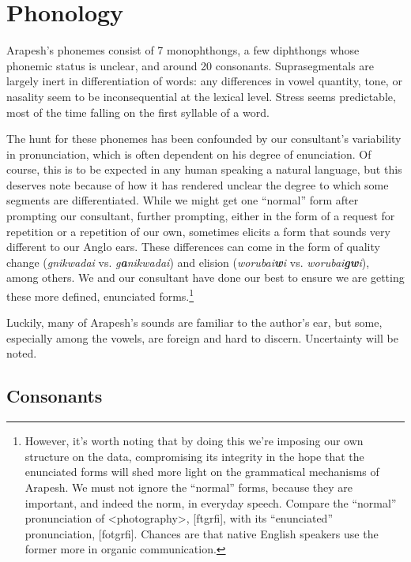 \documentclass[pdftex,12pt,letterpaper]{article}
\let\ipa\textipa
\begin{document}
\section{Phonology}

Arapesh's phonemes consist of 7 monophthongs, a few diphthongs whose phonemic status is unclear, and around 20 consonants. Suprasegmentals are largely inert in differentiation of words: any differences in vowel quantity, tone, or nasality seem to be inconsequential at the lexical level. Stress seems predictable, most of the time falling on the first syllable of a word. 

The hunt for these phonemes has been confounded by our consultant's variability in pronunciation, which is often dependent on his degree of enunciation. Of course, this is to be expected in any human speaking a natural language, but this deserves note because of how it has rendered unclear the degree to which some segments are differentiated. While we might get one ``normal'' form after prompting our consultant, further prompting, either in the form of a request for repetition or a repetition of our own, sometimes elicits a form that sounds very different to our Anglo ears. These differences can come in the form of quality change (\emph{g\textbf{\ipa{@}}nikwadai} vs. \emph{g\textbf{a}nikwadai}) and elision (\emph{worubai\textbf{w}i} vs. \emph{worubai\textbf{gw}i}), among others. We and our consultant have done our best to ensure we are getting these more defined, enunciated forms.\footnote{However, it's worth noting that by doing this we're imposing our own structure on the data, compromising its integrity in the hope that the enunciated forms will shed more light on the grammatical mechanisms of Arapesh. We must not ignore the ``normal'' forms, because they are important, and indeed the norm, in everyday speech. Compare the ``normal'' pronunciation of \textless photography\textgreater, {[f\ipa{@}t\ipa{O}gr\ipa{@}fi]}, with its ``enunciated'' pronunciation, {[fot\ipa{O}gr\ipa{@}fi]}. Chances are that native English speakers use the former more in organic communication.}

Luckily, many of Arapesh's sounds are familiar to the author's ear, but some, especially among the vowels, are foreign and hard to discern. Uncertainty will be noted.

\subsection{Consonants}
\end{document}
